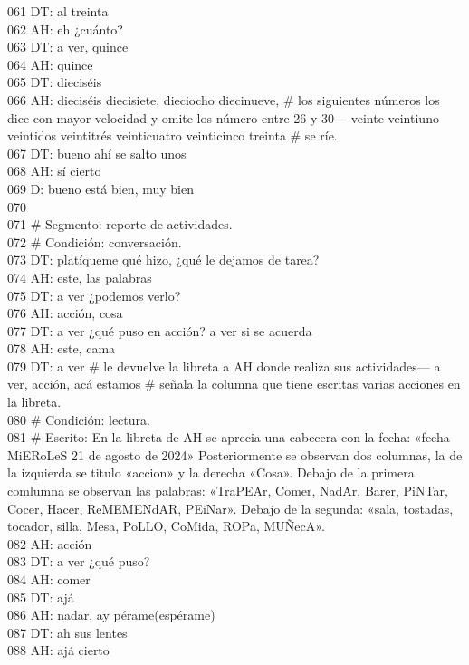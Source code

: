 061 DT: al treinta\\
062 AH: eh ¿cuánto?\\
063 DT: a ver, quince\\
064 AH: quince\\
065 DT: dieciséis\\
066 AH: dieciséis diecisiete, dieciocho diecinueve, \# los siguientes números los dice con mayor velocidad y omite los número entre 26 y 30--- veinte veintiuno veintidos veintitrés veinticuatro veinticinco treinta \# se ríe.\\
067 DT: bueno ahí se salto unos\\
068 AH: sí cierto\\
069 D: bueno está bien, muy bien\\
070 \\
071 \# Segmento: reporte de actividades.\\
072 \# Condición: conversación.\\
073 DT: platíqueme qué hizo, ¿qué le dejamos de tarea?\\
074 AH: este, las palabras\\
075 DT: a ver ¿podemos verlo?\\
076 AH: acción, cosa\\
077 DT: a ver ¿qué puso en acción? a ver si se acuerda\\
078 AH: este, cama\\
079 DT: a ver \# le devuelve la libreta a AH donde realiza sus actividades--- a ver, acción, acá estamos \# señala la columna que tiene escritas varias acciones en la libreta.\\
080 \# Condición: lectura.\\
081 \# Escrito: En la libreta de AH se aprecia una cabecera con la fecha: «fecha MiERoLeS 21 de agosto de 2024» Posteriormente se observan dos columnas, la de la izquierda se titulo «accion» y la derecha «Cosa». Debajo de la primera comlumna se observan las palabras: «TraPEAr, Comer, NadAr, Barer, PiNTar, Cocer, Hacer, ReMEMENdAR, PEiNar». Debajo de la segunda: «sala, tostadas, tocador, silla, Mesa, PoLLO, CoMida, ROPa, MUÑecA».\\
082 AH: acción\\
083 DT: a ver ¿qué puso?\\
084 AH: comer\\
085 DT: ajá\\
086 AH: nadar, ay pérame(espérame)\\
087 DT: ah sus lentes\\
088 AH: ajá cierto\\
